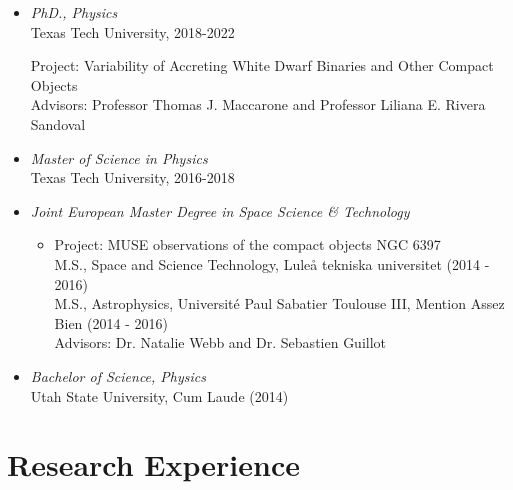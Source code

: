 \documentclass[letterpaper,10pt]{article}
\begin{document}
\begin{itemize}[label=$\blacktriangleright$]



  \item \emph{PhD., Physics}  \\
   Texas Tech University, 2018-2022
      \begin{itemize}[label=]
     Project: Variability of Accreting White Dwarf Binaries and Other Compact Objects  \\
     Advisors: Professor Thomas J. Maccarone and Professor Liliana E. Rivera Sandoval 
      \end{itemize}





  \item \emph{Master of Science in Physics}  \\
   Texas Tech University, 2016-2018



  \item \emph{Joint European Master Degree in Space Science \& Technology} 
  \begin{itemize}[label=]
      \vspace{-.05cm}
      \item Project: MUSE observations of the compact objects NGC 6397 \\
      M.S., Space and Science Technology, Lule\r a tekniska universitet  (2014 - 2016) \\
      M.S., Astrophysics, Universit\'e Paul Sabatier Toulouse III, Mention Assez Bien (2014 - 2016) \\
      Advisors: Dr. Natalie Webb and Dr. Sebastien Guillot
  \end{itemize}




  \item \emph{Bachelor of Science, Physics}  \\
   Utah State University, Cum Laude (2014)

\end{itemize}






\section*{Research Experience}
\end{document}
